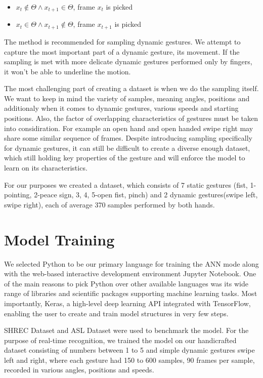 \begin{enumerate}
\begin{itemize}
        \item $x_{t} \notin \Theta \land x_{t+1} \in \Theta$, frame $x_t$ is picked
        \item $x_{t} \in \Theta \land x_{t+1} \notin \Theta$, frame $x_{t+1}$ is picked
    \end{itemize}
    
    The method is recommended for sampling dynamic gestures. We attempt to capture the most important part of a dynamic gesture, its movement. If the sampling is met with more delicate dynamic gestures performed only by fingers, it won't be able to underline the motion.

    The most challenging part of creating a dataset is when we do the sampling itself. We want to keep in mind the variety of samples, meaning angles, positions and additionaly when it comes to dynamic gestures, various speeds and starting positions. Also, the factor of overlapping characteristics of gestures must be taken into considiration. For example an open hand and open handed swipe right may share some similar sequence of frames. Despite introducing sampling specifically for dynamic gestures, it can still be difficult to create a diverse enough dataset, which still holding key properties of the gesture and will enforce the model to learn on its characteristics.

    For our purposes we created a dataset, which consists of 7 static gestures (fist, 1-pointing, 2-peace sign, 3, 4, 5-open fist, pinch) and 2 dynamic gestures(swipe left, swipe right), each of average 370 samples performed by both hands. 

\end{enumerate}


\section{Model Training}
\label{sec:model_training}

We selected Python to be our primary language for training the ANN mode along with the web-based interactive development environment Jupyter Notebook. One of the main reasons to pick Python over other available languages was its wide range of libraries and scientific packages supporting machine learning tasks. Most importantly, Keras, a high-level deep learning API integrated with TensorFlow, enabling the user to create and train model structures in very few steps.

SHREC Dataset and ASL Dataset were used to benchmark the model. For the purpose of real-time recognition, we trained the model on our handicrafted dataset consisting of numbers between 1 to 5 and simple dynamic gestures swipe left and right, where each gesture had 150 to 600 samples, 90 frames per sample, recorded in various angles, positions and speeds. 

